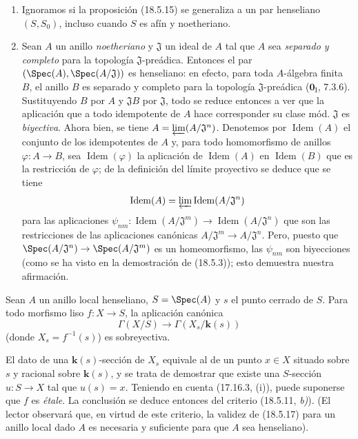 \begin{remarks}[18.5.16]
\label{IV.18.5.16}
\begin{enumerate}
  \item[(i)] Ignoramos si la proposición (18.5.15) se generaliza a un par henseliano $(S,S_0)$, incluso cuando $S$ es afín y noetheriano.
  \item[(ii)] Sean $A$ un anillo \emph{noetheriano} y $\mathfrak J$ un ideal de $A$ tal que $A$ sea \emph{separado y completo} para la topología $\mathfrak J$-preádica. Entonces el par $(\Spec(A),\Spec(A/\mathfrak J))$ es henseliano: en efecto, para toda $A$-álgebra finita $B$, el anillo $B$ es separado y completo para la topología $\mathfrak J$-preádica ($\mathbf 0_{\mathrm I}$, 7.3.6). Sustituyendo $B$ por $A$ y $\mathfrak J B$ por $\mathfrak J$, todo se reduce entonces a ver que la aplicación que a todo idempotente de $A$ hace corresponder su clase mód. $\mathfrak J$ es \emph{biyectiva}. Ahora bien, se tiene $A=\varprojlim (A/\mathfrak J^n)$. Denotemos por $\operatorname{Idem}(A)$ el conjunto de los idempotentes de $A$ y, para todo homomorfismo de anillos $\varphi:A\to B$, sea $\operatorname{Idem}(\varphi)$ la aplicación de $\operatorname{Idem}(A)$ en $\operatorname{Idem}(B)$ que es la restricción de $\varphi$; de la definición del límite proyectivo se deduce que se tiene
  \[
    \operatorname{Idem}(A)=\varprojlim\operatorname{Idem}(A/\mathfrak J^n)
  \]
  para las aplicaciones $\psi_{nm}:\operatorname{Idem}(A/\mathfrak J^m)\to\operatorname{Idem}(A/\mathfrak J^n)$ que son las restricciones de las aplicaciones canónicas $A/\mathfrak J^m\to A/\mathfrak J^n$. Pero, puesto que $\Spec(A/\mathfrak J^n)\to\Spec(A/\mathfrak J^m)$ es un homeomorfismo, las $\psi_{nm}$ son biyecciones (como se ha visto en la demostración de (18.5.3)); esto demuestra nuestra afirmación.
\end{enumerate}
\end{remarks}

\begin{theorem}[18.5.17]
\label{IV.18.5.17}
Sean $A$ un anillo local henseliano, $S=\Spec(A)$ y $s$ el punto cerrado de $S$. Para todo morfismo liso $f:X\to S$, la aplicación canónica
\[
  \Gamma(X/S)\longrightarrow\Gamma(X_s/\boldsymbol k(s))
\]
\textup{(}donde $X_s=f^{-1}(s)$\textup{)} es sobreyectiva.
\end{theorem}

El dato de una $\boldsymbol k(s)$-sección de $X_s$ equivale al de un punto $x\in X$ situado sobre $s$ y racional sobre $\boldsymbol k(s)$, y se trata de demostrar que existe una $S$-sección $u:S\to X$ tal que $u(s)=x$. Teniendo en cuenta (17.16.3, (i)), puede suponerse que $f$ es \emph{étale}. La conclusión se deduce entonces del criterio (18.5.11, \emph{b)}). (El lector observará que, en virtud de este criterio, la validez de (18.5.17) para un anillo local dado $A$ es necesaria y suficiente para que $A$ sea henseliano).

